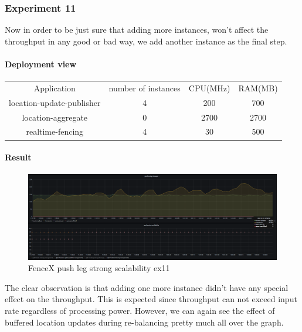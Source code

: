 \documentclass[a4]{report}
\begin{document}
        \clearpage

        \subsubsection{Experiment 11}
        Now in order to be just sure that adding more instances, won't affect the throughput in any good or bad way, we
        add another instance as the final step.

        \paragraph{Deployment view}
        \begin{center}
            \begin{tabular}{ c c c c }
                Application               & number of instances & CPU(MHz) & RAM(MB) \\
                location-update-publisher & 4                   & 200      & 700     \\
                location-aggregate        & 0                   & 2700     & 2700    \\
                realtime-fencing          & 4                   & 30       & 500     \\
            \end{tabular}
        \end{center}

        \paragraph{Result}
        \begin{figure}[ht]
            \caption{FenceX push leg strong scalability ex11}
            \label{fig:ex11}
            \includegraphics[scale=0.4]{images/evaluation/ex11-benchmarking-ongoing-2per4sec.png}
        \end{figure}
        The clear observation is that adding one more instance didn't have any special effect on the throughput.
        This is expected since throughput can not exceed input rate regardless of processing power.
        However, we can again see the effect of buffered location updates during re-balancing pretty much all over the
        graph.
\end{document}
